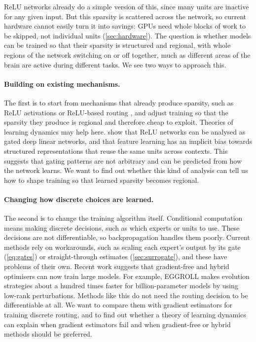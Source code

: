 \documentclass[10pt]{article}
\theoremstyle{definition}
\theoremstyle{remark}
\begin{document}
ReLU networks already do a simple version of this, since many units are inactive for any given input. But this sparsity is scattered across the network, so current hardware cannot easily turn it into savings: GPUs need whole blocks of work to be skipped, not individual units (\cref{sec:hardware}). The question is whether models can be trained so that their sparsity is structured and regional, with whole regions of the network switching on or off together, much as different areas of the brain are active during different tasks. We see two ways to approach this.

\paragraph{Building on existing mechanisms.} The first is to start from mechanisms that already produce sparsity, such as ReLU activations or ReLU-based routing \citep{wang2025remoe}, and adjust training so that the sparsity they produce is regional and therefore cheap to exploit. Theories of learning dynamics may help here. \citet{jarvis2025makehaste} show that ReLU networks can be analysed as gated deep linear networks, and that feature learning has an implicit bias towards structured representations that reuse the same units across contexts. This suggests that gating patterns are not arbitrary and can be predicted from how the network learns. We want to find out whether this kind of analysis can tell us how to shape training so that learned sparsity becomes regional.

\paragraph{Changing how discrete choices are learned.} The second is to change the training algorithm itself. Conditional computation means making discrete decisions, such as which experts or units to use. These decisions are not differentiable, so backpropagation handles them poorly. Current methods rely on workarounds, such as scaling each expert's output by its gate (\cref{eq:gates}) or straight-through estimates (\cref{sec:surrogate}), and these have problems of their own. Recent work suggests that gradient-free and hybrid optimisers can now train large models. For example, EGGROLL \citep{sarkar2025eggroll} makes evolution strategies about a hundred times faster for billion-parameter models by using low-rank perturbations. Methods like this do not need the routing decision to be differentiable at all. We want to compare them with gradient estimators for training discrete routing, and to find out whether a theory of learning dynamics can explain when gradient estimators fail and when gradient-free or hybrid methods should be preferred.
\end{document}
